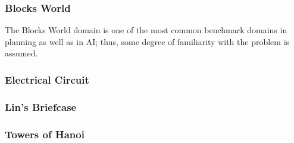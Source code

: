 \subsubsection{Blocks World}
The Blocks World domain is one of the most common benchmark domains in planning as well as in AI; thus, some degree of familiarity with the problem is assumed. 


\subsubsection{Electrical Circuit}


\subsubsection{Lin's Briefcase}


\subsubsection{Towers of Hanoi}

